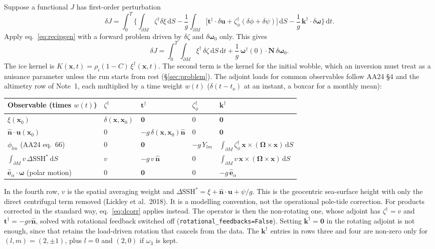 \documentclass[11pt,a4paper]{article}
\newcommand{\bO}{\bm{\Omega}}
\newcommand{\bw}{\bm{\omega}}
\newcommand{\bx}{\mathbf{x}}
\newcommand{\bu}{\mathbf{u}}
\newcommand{\bt}{\mathbf{t}}
\newcommand{\bk}{\mathbf{k}}
\newcommand{\bN}{\mathbf{N}}
\newcommand{\bn}{\hat{\mathbf{n}}}
\newcommand{\be}{\hat{\mathbf{e}}}
\newcommand{\dd}{\,\mathrm{d}}
\newcommand{\pM}{\partial M}
\begin{document}
Suppose a functional $J$ has first-order perturbation
\begin{equation}
  \delta J=\int_0^T\!\Big\{\int_{\pM}\zeta^\dagger\delta\xi\dd S-\frac1g\int_{\pM}\big[\bt^\dagger\cdot\delta\bu+\zeta_\phi^\dagger(\delta\phi+\delta\psi)\big]\dd S-\frac1g\,\bk^\dagger\cdot\delta\bw\Big\}\dd t .
  \label{eq:dJ}
\end{equation}
Apply eq.~\eqref{eq:recipgen} with a forward problem driven by $\delta\zeta$ and $\delta\bw_0$ only. This gives
\begin{equation}
  \delta J=\int_0^T\!\!\int_{\pM}\xi^\dagger\,\delta\zeta\dd S\dd t+\frac1g\,\bw^\dagger(0)\cdot\bN\,\delta\bw_0 .
  \label{eq:kernel}
\end{equation}
The ice kernel is $K(\bx,t)=\rho_i(1-C)\,\xi^\dagger(\bx,t)$. The second term is the kernel for the initial
wobble, which an inversion must treat as a nuisance parameter unless the run starts from rest
(\S\ref{sec:problem}). The adjoint loads for common observables follow AA24 \S4 and the altimetry
row of Note~1, each multiplied by a time weight $w(t)$ ($\delta(t-t_o)$ at an instant, a boxcar for
a monthly mean):
\begin{center}
\small
\begin{tabular}{@{}lllll@{}}
\toprule
Observable (times $w(t)$) & $\zeta^\dagger$ & $\bt^\dagger$ & $\zeta^\dagger_\phi$ & $\bk^\dagger$\\
\midrule
$\xi(\bx_0)$ & $\delta(\bx,\bx_0)$ & $\mathbf{0}$ & $0$ & $\mathbf{0}$\\
$\bn\cdot\bu(\bx_0)$ & $0$ & $-g\,\delta(\bx,\bx_0)\bn$ & $0$ & $\mathbf{0}$\\
$\phi_{lm}$ (AA24 eq.~66) & $0$ & $\mathbf{0}$ & $-g\,Y_{lm}$ & $\int_{\pM}\zeta^\dagger_\phi\,\bx\times(\bO\times\bx)\dd S$\\
$\int_{\pM}v\,\Delta\mathrm{SSH}^*\dd S$ & $v$ & $-g\,v\,\bn$ & $0$ & $\int_{\pM}v\,\bx\times(\bO\times\bx)\dd S$\\
$\be_\alpha\cdot\bw$ (polar motion) & $0$ & $\mathbf{0}$ & $0$ & $-g\,\be_\alpha$\\
\bottomrule
\end{tabular}
\end{center}
In the fourth row, $v$ is the spatial averaging weight and
$\Delta\mathrm{SSH}^*=\xi+\bn\cdot\bu+\psi/g$. This is the geocentric sea-surface height with only the
direct centrifugal term removed (Lickley et al.\ 2018). It is a modelling convention, not the operational
pole-tide correction. For products corrected in the standard way, eq.~\eqref{eq:dcorr} applies instead.
The operator is then the non-rotating one, whose adjoint has $\zeta^\dagger=v$ and
$\bt^\dagger=-gv\bn$, solved with rotational feedback switched off (\texttt{rotational\_feedbacks=False}).
Setting $\bk^\dagger=\mathbf{0}$ in the rotating adjoint is not enough, since that retains the
load-driven rotation that cancels from the data.
The $\bk^\dagger$ entries in rows three and four are non-zero only for $(l,m)=(2,\pm1)$, plus $l=0$
and $(2,0)$ if $\omega_3$ is kept.
\end{document}
